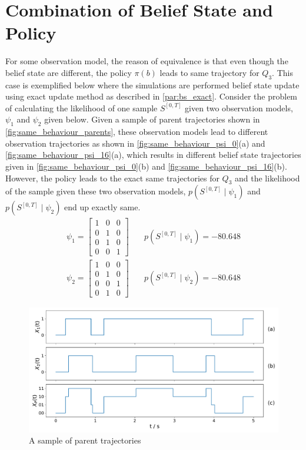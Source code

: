 \section*{Combination of Belief State and Policy}
\label{ap:eq_classes_same_behaviour}
For some observation model, the reason of equivalence is that even though the belief state are different, the policy $ \pi(b) $ leads to same trajectory for $ Q_3 $. This case is exemplified below where the simulations are performed belief state update using exact update method as described in \cref{par:bs_exact}. Consider the problem of calculating the likelihood of one sample $ S^{[0,T]} $ given two observation models, $ \psi_1 $ and $ \psi_2 $ given below. Given a sample of parent trajectories shown in \autoref{fig:same_behaviour_parents}, these observation models lead to different observation trajectories as shown in \autoref{fig:same_behaviour_psi_0}(a) and \autoref{fig:same_behaviour_psi_16}(a), which results in different belief state trajectories given in \autoref{fig:same_behaviour_psi_0}(b) and \autoref{fig:same_behaviour_psi_16}(b). However, the policy leads to the exact same trajectories for $ Q_3 $ and the likelihood of the sample given these two observation models, $ p(S^{[0,T]} \mid \psi_1 ) $ and $ p(S^{[0,T]} \mid \psi_2 ) $ end up exactly same.
\begin{align}
\psi_{1} =
\begin{bmatrix}
1 & 0 & 0 \\
0 & 1 & 0 \\
0 & 1 & 0 \\
0 & 0 & 1
\end{bmatrix} &\quad
p(S^{[0,T]} \mid \psi_1 ) = -80.648 \label{eq:psi_1_1}\\
\psi_{2} =
\begin{bmatrix}
1 & 0 & 0 \\
0 & 1 & 0 \\
0 & 0 & 1 \\
0 & 1 & 0
\end{bmatrix} &\quad
p(S^{[0,T]} \mid \psi_2 ) = -80.648
\label{eq:psi_16}
\end{align}
\begin{figure}[H]
	\begin{center}
		\includegraphics[width=.90\textwidth]{figures/equivalence_classes/same_behaviour/parent_traj}
		\caption{A sample of parent trajectories}
		\label{fig:same_behaviour_parents}
	\end{center}
\end{figure}
